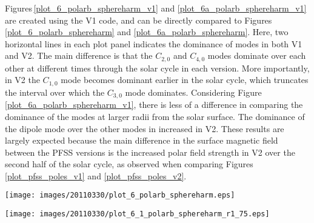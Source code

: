 \documentclass[namedreferences]{solarphysics}
\begin{document}
\begin{article}
Figures\,\ref{plot_6_polarb_sphereharm_v1} and \ref{plot_6a_polarb_sphereharm_v1} are created using the V1 code, and can be directly compared to Figures\,\ref{plot_6_polarb_sphereharm} and \ref{plot_6a_polarb_sphereharm}. Here, two horizontal lines in each plot panel indicates the dominance of modes in both V1 and V2. The main difference is that the $C_{2,0}$ and $C_{4,0}$ modes dominate over each other at different times through the solar cycle in each version. More importantly, in V2 the $C_{1,0}$ mode becomes dominant earlier in the solar cycle, which truncates the interval over which the $C_{3,0}$ mode dominates. Considering Figure\,\ref{plot_6a_polarb_sphereharm_v1}, there is less of a difference in comparing the dominance of the modes at larger radii from the solar surface. The dominance of the dipole mode over the other modes in increased in V2. These results are largely expected because the main difference in the surface magnetic field between the PFSS versions is the increased polar field strength in V2 over the second half of the solar cycle, as observed when comparing Figures\,\ref{plot_pfss_poles_v1} and \ref{plot_pfss_poles_v2}.

\begin{figure*}[!t]
 
\texttt{[image: images/20110330/plot\_6\_polarb\_sphereharm.eps]}
\caption{\emph{Top}: Polar field strengths in the northern (red) and southern (blue) hemispheres. \emph{Middle}: spherical harmonic coefficients, determined using Version 1 of the assimilation code, for the monopolar ($C_{0,0}$; gray line), quadrupolar ($C_{2,0}$; gray line) and $l$$=$4 ($C_{4,0}$; dashed line) modes. The dominance of the $C_{2,0}$ and $C_{4,0}$ modes is indicated by the horizontal solid and dashed lines, respectively. A second line indicating the same information, but using Version 2 of the code is included for comparison. \emph{Bottom}:  spherical harmonic coefficients for the dipolar ($C_{1,0}$; black line), $l$$=$3 ($C_{3,0}$; gray line) and $l$$=$5 ($C_{5,0}$; dashed line) modes. The coefficients are determined for a height of $R=1R_{\odot}$ (i.e., the solar surface).}
\label{plot_6_polarb_sphereharm_v1}
\end{figure*}

\begin{figure*}[!t]
 
\texttt{[image: images/20110330/plot\_6\_1\_polarb\_sphereharm\_r1\_75.eps]}
\caption{PFSS spherical harmonic coefficients as in the middle and bottom panels of Figure\,\ref{plot_6_polarb_sphereharm_v1}, but calculated at a height of 1.75\,$R_{\odot}$ from Sun center.}
\label{plot_6a_polarb_sphereharm_v1}
\end{figure*}

\end{article} 
\end{document}
